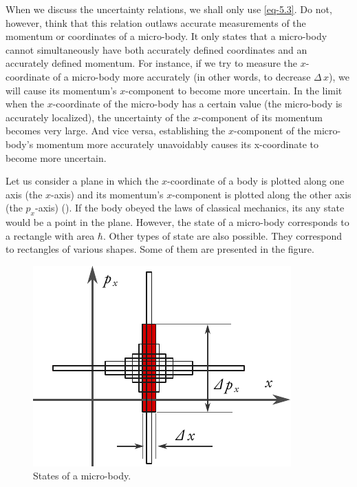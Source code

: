 When we discuss the uncertainty relations, we shall only use \eqref{eq-5.3}. Do not, however, think that this relation outlaws accurate measurements of the momentum or coordinates of a micro-body. It only states that a micro-body cannot simultaneously have both accurately defined coordinates and an accurately defined momentum. For instance, if we try to measure the $x$-coordinate of a micro-body more accurately (in other words, to decrease $\Delta \, x$), we will cause its momentum's $x$-component to become more uncertain. In the limit when the
$x$-coordinate of the micro-body has a certain value (the micro-body is
accurately localized), the uncertainty of the $x$-component of its
momentum becomes very large. And vice versa, establishing the
$x$-component of the micro-body's momentum more accurately
unavoidably causes its x-coordinate to become more uncertain.

Let us consider a plane in which the $x$-coordinate of a body is plotted
along one axis (the $x$-axis) and its momentum's $x$-component is plotted
along the other axis (the $p_{x}$-axis) (). If the body obeyed the laws of classical mechanics, its any state would be a point in the plane. However, the state of a micro-body corresponds to a rectangle with area $\hbar$. Other types of state are also possible. They correspond to rectangles of various shapes. Some of them are presented in the figure.

\begin{figure}
\centering
\includegraphics[width=1.\textwidth]{figures/unc.pdf}
\caption{ States of a micro-body.\label{unc}}
\end{figure}

